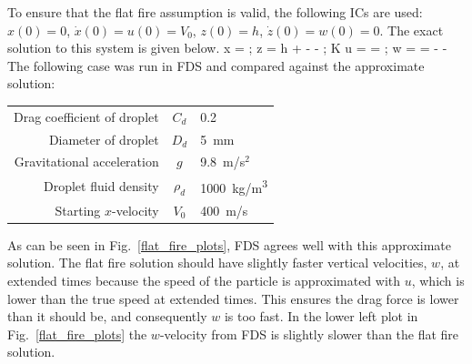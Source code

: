 \documentclass[11pt]{book}
\begin{document}
To ensure that the flat fire assumption is valid, the following ICs are used: $x(0) = 0$, $\dot{x}(0) = u(0) = V_0$, $z(0) = h$, $\dot{z}(0) = w(0) = 0$. The exact solution to this system is given below.
\be
    x =  \quad ; \quad
    z = h +  -  -  \quad ; \quad
    K \equiv {}
\ee
\be
    u =  =  \quad ; \quad w =  =  -  - 
\ee
The following case was run in FDS and compared against the approximate solution:
\begin{center}
\begin{tabular}{|r|c|l|}
\hline
Drag coefficient of droplet & $C_d$ & 0.2 \\
Diameter of droplet & $D_d$ & 5~mm \\
Gravitational acceleration & $g$ & 9.8~m/s$^2$ \\
Droplet fluid density & $\rho_d$ & 1000~\si{kg/m^3} \\
Starting $x$-velocity & $V_0$ & 400~m/s \\
\hline
\end{tabular}
\end{center}
As can be seen in Fig.~\ref{flat_fire_plots}, FDS agrees well with this approximate solution. The flat fire solution should have slightly faster vertical velocities, $w$, at extended times because the speed of the particle is approximated with $u$, which is lower than the true speed at extended times. This ensures the drag force is lower than it should be, and consequently $w$ is too fast. In the lower left plot in Fig.~\ref{flat_fire_plots} the $w$-velocity from FDS is slightly slower than the flat fire solution.
\end{document}

